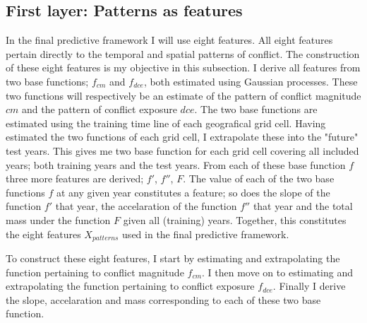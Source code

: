 \documentclass[a4paper]{article}
\begin{document}

\subsection{First layer: Patterns as features}


In the final predictive framework I will use eight features. All eight features pertain directly to the temporal and spatial patterns of conflict. The construction of these eight features is my objective in this subsection. I derive all features from two base functions; $f_{cm}$ and $f_{dce}$, both estimated using Gaussian processes. These two functions will respectively be an estimate of the pattern of conflict magnitude $cm$ and the pattern of conflict exposure $dce$. The two base functions are estimated using the training time line of each geografical grid cell. Having estimated the two functions of each grid cell, I extrapolate these into the "future" test years. This gives me two base function for each grid cell covering all included years; both training years and the test years. From each of these base function $f$ three more features are derived; $f'$, $f''$, $F$. The value of each of the two base functions $f$ at any given year constitutes a feature; so does the slope of the function $f'$ that year, the accelaration of the function $f''$ that year and the total mass under the function $F$ given all (training) years. Together, this constitutes the eight features $X_{patterns}$ used in the final predictive framework.\par 

To construct these eight features, I start by estimating and extrapolating the function pertaining to conflict magnitude $f_{cm}$. I then move on to estimating and extrapolating the function pertaining to conflict exposure $f_{dce}$. Finally I derive the slope, accelaration and mass corresponding to each of these two base function.\par
\end{document}

